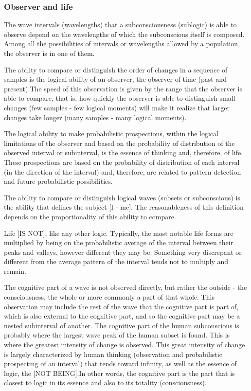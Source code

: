 \subsubsection{Observer and life}
The wave intervals (wavelengths) that a subconsciousness (sublogic) is able to observe depend on the wavelengths of which the subconscious itself is composed. Among all the possibilities of intervals or wavelengths allowed by a population, the observer is in one of them. 

The ability to compare or distinguish the order of changes in a sequence of samples is the logical ability of an observer, the observer of time (past and present).The speed of this observation is given by the range that the observer is able to compare, that is, how quickly the observer is able to distinguish small changes (few samples - few logical moments) will make it realize that larger changes take longer (many samples - many logical moments).

The logical ability to make probabilistic prospections, within the logical limitations of the observer and based on the probability of distribution of the observed interval or subinterval, is the essence of thinking and, therefore, of life. These prospections are based on the probability of distribution of each interval (in the direction of the interval) and, therefore, are related to pattern detection and future probabilistic possibilities.

The ability to compare or distinguish logical waves (subsets or subconscious) is the ability that defines the subject [I - me]. The reasonableness of this definition depends on the proportionality of this ability to compare.

Life [IS NOT], like any other logic. Typically, the most notable life forms are multiplied by being on the probabilistic average of the interval between their peaks and valleys, however different they may be. Something very discrepant or different from the average pattern of the interval tends not to multiply and remain.

The cognitive part of a wave is not observed directly, but rather the outside - the consciousness, the whole or more commonly a part of that whole. This observation may include the rest of the wave that the cognitive part is part of, which is also external to the cognitive part, and so the cognitive part may be a nested subinterval of another. The cognitive part of the human subconscious is probably where the largest wave peak of the human subset is found. This is where the greatest intensity of change is observed. This great intensity of change is largely characterized by human thinking (observation and probabilistic prospecting of an interval) that tends toward infinity, as well as the essence of logic, the [NOT BEING].In other words, the cognitive part is the part that is closest to logic in its essence and also to its totality (consciousness).

